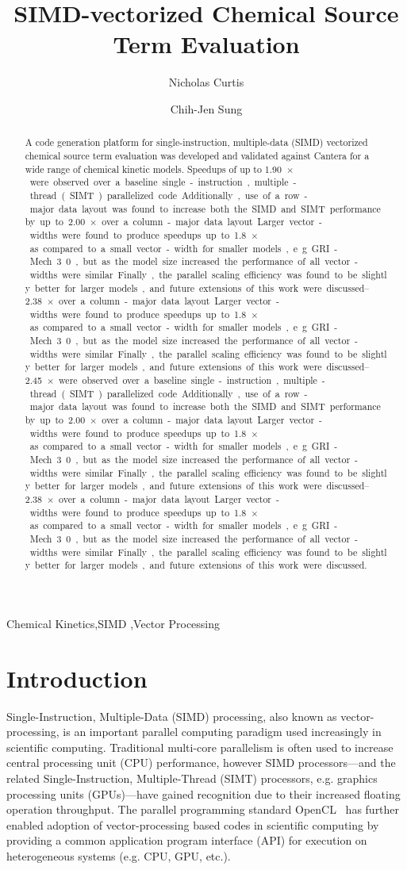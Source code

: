 \documentclass[12pt]{ussci}
\title{SIMD-vectorized Chemical Source Term Evaluation}
\author[*]{Nicholas Curtis}
\author[ ]{Chih-Jen Sung}
\affil[ ]{Department of Mechanical Engineering, University of Connecticut, Storrs, CT 06269, USA}
\affil[*]{Corresponding author: \email{nicholas.curtis@uconn.edu}}
\begin{document}
\maketitle

\begin{abstract} %
A code generation platform for single-instruction, multiple-data (SIMD) vectorized chemical source term evaluation was developed and validated against Cantera for a wide range of chemical kinetic models.
Speedups of up to \SIrange{1.90}{2.45}{$\times$} were observed over a baseline single-instruction, multiple-thread (SIMT) parallelized code.
Additionally, use of a row-major data layout was found to increase both the SIMD and SIMT performance by up to \SIrange{2.00}{2.38}{$\times$} over a column-major data layout.
Larger vector-widths were found to produce speedups up to \SI{1.8}{$\times$} as compared to a small vector-width for smaller models, e.g. GRI-Mech 3.0, but as the model size increased the performance of all vector-widths were similar.
Finally, the parallel scaling efficiency was found to be slightly better for larger models, and future extensions of this work were discussed.
\end{abstract}

\begin{keyword}
    Chemical Kinetics\sep SIMD \sep Vector Processing
\end{keyword}

\section{Introduction}
%

Single-Instruction, Multiple-Data (SIMD) processing, also known as vector-processing, is an important parallel computing paradigm used increasingly in scientific computing.
Traditional multi-core parallelism is often used to increase central processing unit (CPU) performance, however SIMD processors---and the related Single-Instruction, Multiple-Thread (SIMT) processors, e.g. graphics processing units (GPUs)---have gained recognition due to their increased floating operation throughput.
The parallel programming standard OpenCL~\cite{stone2010opencl} has further enabled adoption of vector-processing based codes in scientific computing by providing a common application program interface (API) for execution on heterogeneous systems (e.g. CPU, GPU, etc.).
\end{document}
